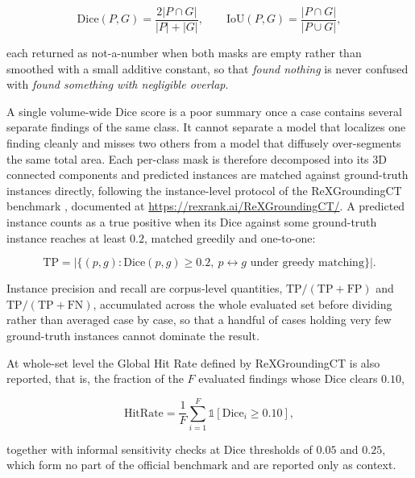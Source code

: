 \begin{equation}[Dice and IoU]
\mathrm{Dice}(P,G) = \frac{2|P \cap G|}{|P| + |G|}, \qquad
\mathrm{IoU}(P,G) = \frac{|P \cap G|}{|P \cup G|},
\label{eq:dice-iou}
\end{equation}

each returned as not-a-number when both masks are empty rather than smoothed with a small
additive constant, so that \emph{found nothing} is never confused with \emph{found something
with negligible overlap}.

A single volume-wide Dice score is a poor summary once a case contains several separate
findings of the same class. It cannot separate a model that localizes one finding cleanly
and misses two others from a model that diffusely over-segments the same total area. Each
per-class mask is therefore decomposed into its 3D connected components and predicted
instances are matched against ground-truth instances directly, following the instance-level
protocol of the ReXGroundingCT benchmark
\cite{rajpurkar2024rexgroundingct,zhang2024rexrankpublicleaderboardaipowered}, documented at
\url{https://rexrank.ai/ReXGroundingCT/}. A predicted instance counts as a true positive
when its Dice against some ground-truth instance reaches at least $0.2$, matched greedily
and one-to-one:

\begin{equation}[Instance-Level True Positives]
\mathrm{TP} = \bigl|\{(p,g) : \mathrm{Dice}(p,g) \ge 0.2,\ p \leftrightarrow g \text{ under greedy matching}\}\bigr|.
\label{eq:instance-tp}
\end{equation}

Instance precision and recall are corpus-level quantities, $\mathrm{TP}/(\mathrm{TP+FP})$
and $\mathrm{TP}/(\mathrm{TP+FN})$, accumulated across the whole evaluated set before
dividing rather than averaged case by case, so that a handful of cases holding very few
ground-truth instances cannot dominate the result.

At whole-set level the Global Hit Rate defined by ReXGroundingCT is also reported, that is,
the fraction of the $F$ evaluated findings whose Dice clears $0.10$,

\begin{equation}[Global Hit Rate]
\mathrm{HitRate} = \frac{1}{F}\sum_{i=1}^{F} \mathbb{1}\!\left[\mathrm{Dice}_i \ge 0.10\right],
\label{eq:hit-rate}
\end{equation}

\noindent together with informal sensitivity checks at Dice thresholds of $0.05$ and $0.25$, which
form no part of the official benchmark and are reported only as context.

